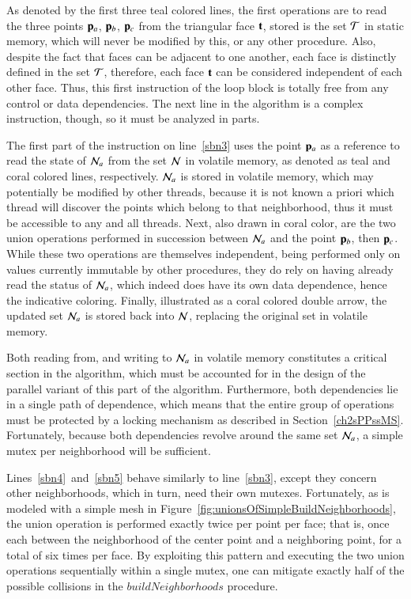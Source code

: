 As denoted by the first three teal colored lines, the first operations are to read the three points $\mathbf{p}_a$, $\mathbf{p}_b$, $\mathbf{p}_c$ from the triangular face $\mathbf{t}$, stored is the set $\mathcal{T}$ in static memory, which will never be modified by this, or any other procedure. Also, despite the fact that faces can be adjacent to one another, each face is distinctly defined in the set $\mathcal{T}$, therefore, each face $\mathbf{t}$ can be considered independent of each other face. Thus, this first instruction of the loop block is totally free from any control or data dependencies. The next line in the algorithm is a complex instruction, though, so it must be analyzed in parts.

The first part of the instruction on line~\ref{sbn3} uses the point $\mathbf{p}_a$ as a reference to read the state of $\mathcal{N}_a$ from the set $\mathcal{N}$ in volatile memory, as denoted as teal and coral colored lines, respectively. $\mathcal{N}_a$ is stored in volatile memory, which may potentially be modified by other threads, because it is not known a priori which thread will discover the points which belong to that neighborhood, thus it must be accessible to any and all threads. Next, also drawn in coral color, are the two union operations performed in succession between $\mathcal{N}_a$ and the point $\mathbf{p}_b$, then $\mathbf{p}_c$. While these two operations are themselves independent, being performed only on values currently immutable by other procedures, they do rely on having already read the status of $\mathcal{N}_a$, which indeed does have its own data dependence, hence the indicative coloring. Finally, illustrated as a coral colored double arrow, the updated set $\mathcal{N}_a$ is stored back into $\mathcal{N}$, replacing the original set in volatile memory.

Both reading from, and writing to $\mathcal{N}_a$ in volatile memory constitutes a critical section in the algorithm, which must be accounted for in the design of the parallel variant of this part of the algorithm. Furthermore, both dependencies lie in a single path of dependence, which means that the entire group of operations must be protected by a locking mechanism as described in Section~\ref{ch2sPPssMS}. Fortunately, because both dependencies revolve around the same set $\mathcal{N}_a$, a simple mutex per neighborhood will be sufficient.

Lines~\ref{sbn4}~and~\ref{sbn5} behave similarly to line~\ref{sbn3}, except they concern other neighborhoods, which in turn, need their own mutexes. Fortunately, as is modeled with a simple mesh in Figure~\ref{fig:unionsOfSimpleBuildNeighborhoods}, the union operation is performed exactly twice per point per face; that is, once each between the neighborhood of the center point and a neighboring point, for a total of six times per face. By exploiting this pattern and executing the two union operations sequentially within a single mutex, one can mitigate exactly half of the possible collisions in the $\mathit{buildNeighborhoods}$ procedure.

